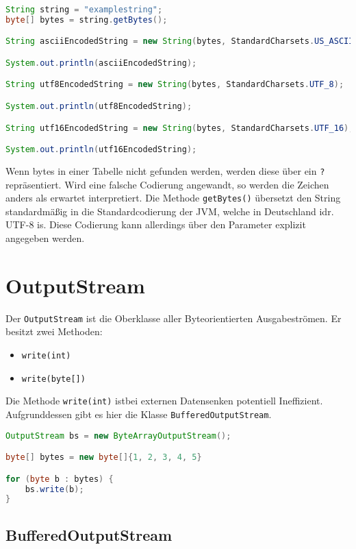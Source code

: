 \begin{lstlisting}[language=Java, caption={Beispiel für String Codierung ändern}]
String string = "examplestring";
byte[] bytes = string.getBytes();

String asciiEncodedString = new String(bytes, StandardCharsets.US_ASCII);

System.out.println(asciiEncodedString); 

String utf8EncodedString = new String(bytes, StandardCharsets.UTF_8);

System.out.println(utf8EncodedString);  

String utf16EncodedString = new String(bytes, StandardCharsets.UTF_16);

System.out.println(utf16EncodedString); 
\end{lstlisting}

Wenn bytes in einer Tabelle nicht gefunden werden, werden diese über ein \lstinline{?}
repräsentiert. Wird eine falsche Codierung angewandt, so werden die Zeichen
anders als erwartet interpretiert. Die Methode \lstinline{getBytes()} übersetzt den String
standardmäßig in die Standardcodierung der JVM, welche in Deutschland idr.
UTF-8 is. Diese Codierung kann allerdings über den Parameter explizit angegeben
werden.

\section{OutputStream}

Der \lstinline{OutputStream} ist die Oberklasse aller Byteorientierten Ausgabeströmen. Er
besitzt zwei Methoden:
\begin{itemize}
    \item \lstinline{write(int)}
    \item \lstinline{write(byte[])}
\end{itemize}

Die Methode \lstinline{write(int)} istbei externen Datensenken potentiell
Ineffizient. Aufgrunddessen gibt es hier die Klasse \lstinline{BufferedOutputStream}.

\begin{lstlisting}[language=Java, caption={Beispiel für OutputStream}]
OutputStream bs = new ByteArrayOutputStream();

byte[] bytes = new byte[]{1, 2, 3, 4, 5}

for (byte b : bytes) {
    bs.write(b);
}
\end{lstlisting}

\subsection{BufferedOutputStream}

